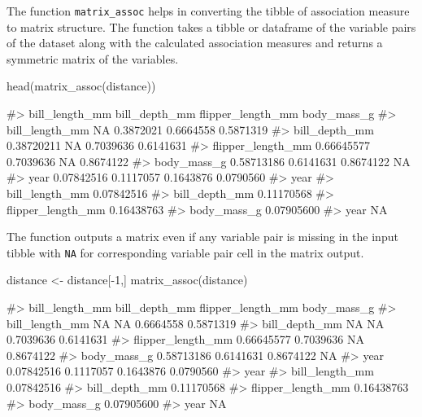 The function \texttt{matrix\_assoc} helps in converting the tibble of
association measure to matrix structure. The function takes a tibble or
dataframe of the variable pairs of the dataset along with the calculated
association measures and returns a symmetric matrix of the variables.

\begin{Schunk}
\begin{Sinput}
head(matrix_assoc(distance))
\end{Sinput}
\begin{Soutput}
#>                   bill_length_mm bill_depth_mm flipper_length_mm body_mass_g
#> bill_length_mm                NA     0.3872021         0.6664558   0.5871319
#> bill_depth_mm         0.38720211            NA         0.7039636   0.6141631
#> flipper_length_mm     0.66645577     0.7039636                NA   0.8674122
#> body_mass_g           0.58713186     0.6141631         0.8674122          NA
#> year                  0.07842516     0.1117057         0.1643876   0.0790560
#>                         year
#> bill_length_mm    0.07842516
#> bill_depth_mm     0.11170568
#> flipper_length_mm 0.16438763
#> body_mass_g       0.07905600
#> year                      NA
\end{Soutput}
\end{Schunk}

The function outputs a matrix even if any variable pair is missing in
the input tibble with \texttt{NA} for corresponding variable pair cell
in the matrix output.

\begin{Schunk}
\begin{Sinput}
distance <- distance[-1,]
matrix_assoc(distance)
\end{Sinput}
\begin{Soutput}
#>                   bill_length_mm bill_depth_mm flipper_length_mm body_mass_g
#> bill_length_mm                NA            NA         0.6664558   0.5871319
#> bill_depth_mm                 NA            NA         0.7039636   0.6141631
#> flipper_length_mm     0.66645577     0.7039636                NA   0.8674122
#> body_mass_g           0.58713186     0.6141631         0.8674122          NA
#> year                  0.07842516     0.1117057         0.1643876   0.0790560
#>                         year
#> bill_length_mm    0.07842516
#> bill_depth_mm     0.11170568
#> flipper_length_mm 0.16438763
#> body_mass_g       0.07905600
#> year                      NA
\end{Soutput}
\end{Schunk}


